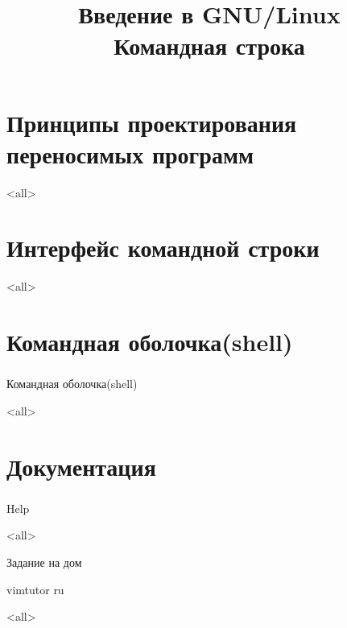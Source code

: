 
\title{Введение в GNU/Linux\\Командная строка}


\begin{frame}
 \frametitle{}
 \titlepage
\end{frame}

\section{Принципы проектирования переносимых программ}
\mode<all>{}

\section{Интерфейс командной строки}
\mode<all>{}

\section{ Командная оболочка(shell) }
\begin{frame}
\frametitle{}
 \begin{center}
   {\Large Командная оболочка(shell) }
 \end{center}
\end{frame}

\mode<all>{}

\section{ Документация }
\begin{frame}
\frametitle{}
 \begin{center}
   {\Large Help }
 \end{center}
\end{frame}
\mode<all>{}

\begin{frame}{Задание на дом}
\begin{block}{}
vimtutor ru
\end{block}
\end{frame}

\mode<all>

